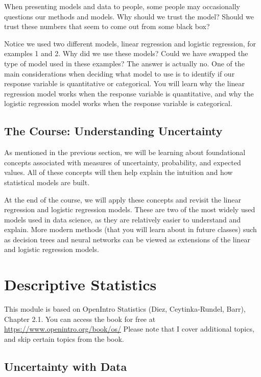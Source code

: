 \documentclass[
]{book}
\begin{document}
When presenting models and data to people, some people may occasionally questions our methods and models. Why should we trust the model? Should we trust these numbers that seem to come out from some black box?

Notice we used two different models, linear regression and logistic regression, for examples 1 and 2. Why did we use these models? Could we have swapped the type of model used in these examples? The answer is actually no. One of the main considerations when deciding what model to use is to identify if our response variable is quantitative or categorical. You will learn why the linear regression model works when the response variable is quantitative, and why the logistic regression model works when the response variable is categorical.

\section{The Course: Understanding Uncertainty}\label{the-course-understanding-uncertainty}

As mentioned in the previous section, we will be learning about foundational concepts associated with measures of uncertainty, probability, and expected values. All of these concepts will then help explain the intuition and how statistical models are built.

At the end of the course, we will apply these concepts and revisit the linear regression and logistic regression models. These are two of the most widely used models used in data science, as they are relatively easier to understand and explain. More modern methods (that you will learn about in future classes) such as decision trees and neural networks can be viewed as extensions of the linear and logistic regression models.

\chapter{Descriptive Statistics}\label{descriptive}

This module is based on OpenIntro Statistics (Diez, Ceytinka-Rundel, Barr), Chapter 2.1. You can access the book for free at \url{https://www.openintro.org/book/os/} Please note that I cover additional topics, and skip certain topics from the book.

\section{Uncertainty with Data}\label{uncertainty-with-data}
\end{document}
